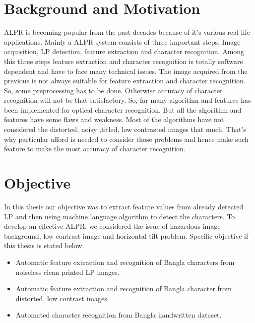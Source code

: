 \section{Background and Motivation}
ALPR is becoming popular from the past decades because of it's various real-life applications. Mainly a ALPR system consists of three important steps. Image acquisition, LP detection, feature extraction and character recognition. Among this three steps feature extraction and character recognition is totally software dependent and have to face many technical issues. The image acquired from the previous is not always suitable for feature extraction and character recognition. So, some preprocessing has to be done. Otherwise accuracy of character recognition will not be that satisfactory.
So, far many algorithm and features has been implemented for optical character recognition. But all the algorithm and features have some flaws and weakness. Most of the algorithms have not considered the distorted, noisy ,titled, low contrasted images that much. That's why particular afford is needed to consider those problems and hence make such feature to make the most accuracy of character recognition.

				
\section{Objective}
In this thesis our objective was to extract feature values from already detected LP and then using machine language algorithm to detect the characters. To develop an effective ALPR, we considered the issue of hazardous image background, low contrast image and horizontal tilt problem. Specific objective if this thesis is stated below.
\begin{itemize}
\item Automatic feature extraction and recognition of Bangla characters from noiseless clean printed LP images.
\item Automatic feature extraction and recognition of Bangla character from distorted, low contrast images.
\item Automated character recognition from Bangla handwritten dataset.
\end{itemize}

